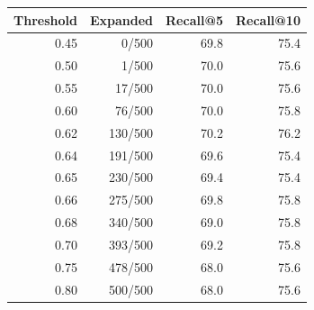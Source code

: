 \begin{tabular}{rrrr}
\toprule
Threshold & Expanded & Recall@5 & Recall@10 \\
\midrule
0.45 & 0/500 & 69.8 & 75.4 \\
0.50 & 1/500 & 70.0 & 75.6 \\
0.55 & 17/500 & 70.0 & 75.6 \\
0.60 & 76/500 & 70.0 & 75.8 \\
0.62 & 130/500 & 70.2 & 76.2 \\
0.64 & 191/500 & 69.6 & 75.4 \\
0.65 & 230/500 & 69.4 & 75.4 \\
0.66 & 275/500 & 69.8 & 75.8 \\
0.68 & 340/500 & 69.0 & 75.8 \\
0.70 & 393/500 & 69.2 & 75.8 \\
0.75 & 478/500 & 68.0 & 75.6 \\
0.80 & 500/500 & 68.0 & 75.6 \\
\bottomrule
\end{tabular}
